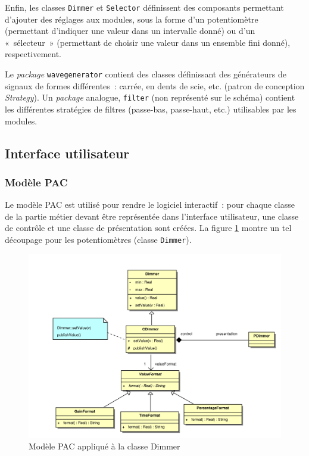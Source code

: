 Enfin, les classes \verb!Dimmer! et \verb!Selector! définissent des
composants permettant d'ajouter des réglages aux modules, sous la
forme d'un potentiomètre (permettant d'indiquer une valeur dans un
intervalle donné) ou d'un «~sélecteur~» (permettant de choisir une
valeur dans un ensemble fini donné), respectivement.

Le \emph{package} \verb!wavegenerator! contient des classes
définissant des générateurs de signaux de formes différentes~:
carrée, en dents de scie, etc. (patron de conception
\emph{Strategy}). Un \emph{package} analogue, \verb!filter! (non
représenté sur le schéma) contient les différentes stratégies de
filtres (passe-bas, passe-haut, etc.) utilisables par les modules.

\subsection{Interface utilisateur}

\subsubsection{Modèle PAC}

Le modèle PAC est utilisé pour rendre le logiciel interactif~: pour
chaque classe de la partie métier devant être représentée dans
l'interface utilisateur, une classe de contrôle et une classe de
présentation sont créées. La figure \ref{pacdimmer-pim} montre un tel découpage pour
les potentiomètres (classe \verb!Dimmer!).

\begin{figure}[h]
\centering
\includegraphics[width=16cm]{../img/ps/pacdimmer-pim.pdf}
\caption{Modèle PAC appliqué à la classe Dimmer}
\label{pacdimmer-pim}
\end{figure}


